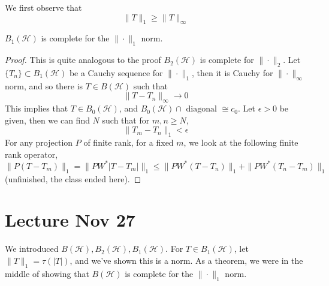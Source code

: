We first observe that
\begin{equation*}
    \|T\|_1\geq\|T\|_\infty
\end{equation*}
\begin{proposition}
    $B_1(\mathcal{H})$ is complete for the $\|\cdot\|_1$ norm.
\end{proposition}
\begin{proof}
    This is quite analogous to the proof $B_2(\mathcal{H})$ is complete for $\|\cdot\|_2$. Let $\{T_n\}\subset B_1(\mathcal{H})$ be a Cauchy sequence for $\|\cdot\|_1$, then it is Cauchy for $\|\cdot\|_\infty$ norm, and so there is $T\in B(\mathcal{H})$ such that 
    \begin{equation*}
        \|T-T_n\|_\infty\to 0
    \end{equation*}
    This implies that $T\in B_0(\mathcal{H})$, and $B_0(\mathcal{H})\cap \text{ diagonal }\cong c_0$. Let $\epsilon>0$ be given, then we can find $N$ such that for $m,n\geq N$, 
    \begin{equation*}
        \|T_m-T_n\|_1<\epsilon
    \end{equation*}
    For any projection $P$ of finite rank, for a fixed $m$, we look at the following finite rank operator,
    \begin{equation*}
        \|P(T-T_m)\|_1=\|PW^*|T-T_m|\|_1\leq\|PW^*(T-T_n)\|_1+\|PW^*(T_n-T_m)\|_1
    \end{equation*}
    (unfinished, the class ended here).
\end{proof}


\section{Lecture Nov 27}
We introduced $B(\mathcal{H}), B_2(\mathcal{H}), B_1(\mathcal{H})$. For $T\in B_1(\mathcal{H})$, let $\|T\|_1=\tau(|T|)$, and we've shown this is a norm. As a theorem, we were in the middle of showing that $B(\mathcal{H})$ is complete for the $\|\cdot\|_1$ norm.

